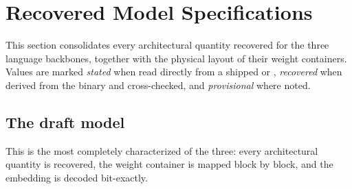 \section{Recovered Model Specifications}\label{sec:modelspec}

This section consolidates every architectural quantity recovered for the three language backbones,
together with the physical layout of their weight containers. Values are marked \emph{stated} when
read directly from a shipped  or ,
\emph{recovered} when derived from the binary and cross-checked, and \emph{provisional} where noted.

\subsection{The draft model }

This is the most completely characterized of the three: every architectural quantity is recovered,
the weight container is mapped block by block, and the embedding is decoded bit-exactly.

